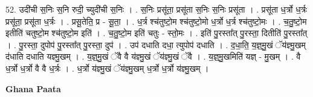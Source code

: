 \documentclass[17pt]{extarticle}
\begin{document}
52. उदी॑ची स॒निः स॒नि रुदी॒ च्युदी॑ची स॒निः । . स॒निः प्रसू॑ता॒ प्रसू॑ता स॒निः स॒निः प्रसू॑ता । . प्रसू॑ता ध॒र्त्रो ध॒र्त्रः प्रसू॑ता॒ प्रसू॑ता ध॒र्त्रः । . प्रसू॒तेति॒ प्र - सू॒ता॒ । . ध॒र्त्र श्च॑तुष्टो॒म श्च॑तुष्टो॒मो ध॒र्त्रो ध॒र्त्र श्च॑तुष्टो॒मः । . च॒तु॒ष्टो॒म इतीति॑ चतुष्टो॒म श्च॑तुष्टो॒म इति॑ । . च॒तु॒ष्टो॒म इति॑ चतुः - स्तो॒मः । . इति॑ पु॒रस्ता᳚त् पु॒रस्ता॒ दितीति॑ पु॒रस्ता᳚त् । . पु॒रस्ता॒ दुपोप॑ पु॒रस्ता᳚त् पु॒रस्ता॒ दुप॑ । . उप॑ दधाति दधा॒ त्युपोप॑ दधाति । . द॒धा॒ति॒ य॒ज्ञ्॒मु॒खं ॅय॑ज्ञ्मु॒खम् द॑धाति दधाति यज्ञ्मु॒खम् । . य॒ज्ञ्॒मु॒खं ॅवै वै य॑ज्ञ्मु॒खं ॅय॑ज्ञ्मु॒खं ॅवै । . य॒ज्ञ्॒मु॒खमिति॑ यज्ञ् - मु॒खम् । . वै ध॒र्त्रो ध॒र्त्रो वै वै ध॒र्त्रः । . ध॒र्त्रो य॑ज्ञ्मु॒खं ॅय॑ज्ञ्मु॒खम् ध॒र्त्रो ध॒र्त्रो य॑ज्ञ्मु॒खम् । \newline

\textbf{Ghana Paata } \newline
\end{document}
